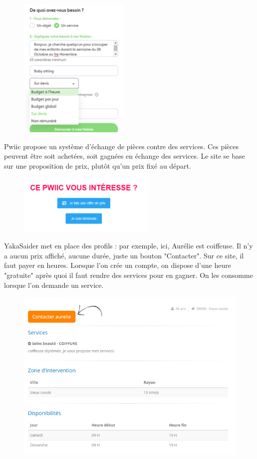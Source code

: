 \documentclass[a4paper,11pt]{article}
\begin{document}
\begin{figure}[H]
  \includegraphics[width=200px]{images/services-allovoisins.png}
  \label{fig:services-allovoisins}
\end{figure}

Pwiic propose un système d’échange de pièces contre des services. Ces pièces peuvent être soit achetées,
soit gagnées en échange des services. Le site se base sur une proposition de prix, plutôt qu’un prix fixé au départ.\\

\begin{figure}[H]
  \includegraphics[width=250px]{images/pieces-pwiic.png}
  \label{fig:pieces-pwiic}
\end{figure}

YakaSaider met en place des profils : par exemple, ici, Aurélie est coiffeuse. Il n’y a aucun prix affiché,
aucune durée, juste un bouton "Contacter". Sur ce site, il faut payer en heures. Lorsque l’on crée un compte,
on dispose d’une heure "gratuite" après quoi il faut rendre des services pour en gagner.
On les consomme lorsque l’on demande un service.\\

\begin{figure}[H]
  \includegraphics[width=500px]{images/aurelie-yakasaider.png}
  \label{fig:aurelie-yakasaider}
\end{figure}
\end{document}
